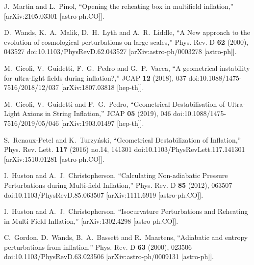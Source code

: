 \documentclass[a4paper,11pt]{article}
\begin{document}
\begin{thebibliography}{10}
J.~Martin and L.~Pinol,
``Opening the reheating box in multifield inflation,''
[arXiv:2105.03301 [astro-ph.CO]].

D.~Wands, K.~A.~Malik, D.~H.~Lyth and A.~R.~Liddle,
``A New approach to the evolution of cosmological perturbations on large scales,''
Phys. Rev. D \textbf{62} (2000), 043527
doi:10.1103/PhysRevD.62.043527
[arXiv:astro-ph/0003278 [astro-ph]].

M.~Cicoli, V.~Guidetti, F.~G.~Pedro and G.~P.~Vacca,
``A geometrical instability for ultra-light fields during inflation?,''
JCAP \textbf{12} (2018), 037
doi:10.1088/1475-7516/2018/12/037
[arXiv:1807.03818 [hep-th]].

M.~Cicoli, V.~Guidetti and F.~G.~Pedro,
``Geometrical Destabilisation of Ultra-Light Axions in String Inflation,''
JCAP \textbf{05} (2019), 046
doi:10.1088/1475-7516/2019/05/046
[arXiv:1903.01497 [hep-th]].

S.~Renaux-Petel and K.~Turzy\'nski,
``Geometrical Destabilization of Inflation,''
Phys. Rev. Lett. \textbf{117} (2016) no.14, 141301
doi:10.1103/PhysRevLett.117.141301
[arXiv:1510.01281 [astro-ph.CO]].

I.~Huston and A.~J.~Christopherson,
``Calculating Non-adiabatic Pressure Perturbations during Multi-field Inflation,''
Phys. Rev. D \textbf{85} (2012), 063507
doi:10.1103/PhysRevD.85.063507
[arXiv:1111.6919 [astro-ph.CO]].

I.~Huston and A.~J.~Christopherson,
``Isocurvature Perturbations and Reheating in Multi-Field Inflation,''
[arXiv:1302.4298 [astro-ph.CO]].

C.~Gordon, D.~Wands, B.~A.~Bassett and R.~Maartens,
``Adiabatic and entropy perturbations from inflation,''
Phys. Rev. D \textbf{63} (2000), 023506
doi:10.1103/PhysRevD.63.023506
[arXiv:astro-ph/0009131 [astro-ph]].


\end{thebibliography}
\end{document}
